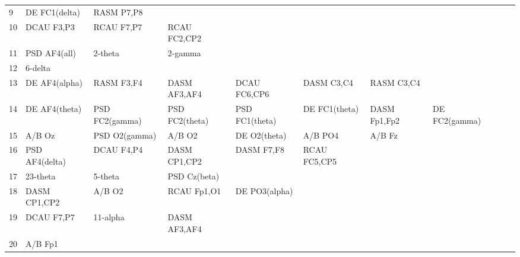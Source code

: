 \begin{landscape}
\begin{table}[]
\begin{tabular}{l|llllllll}
9        & DE FC1(delta)  & RASM P7,P8     &                &                &                &                &                &                &               &              \\
10       & DCAU F3,P3     & RCAU F7,P7     & RCAU FC2,CP2   &                &                &                &                &                &               &              \\
11       & PSD AF4(all)   & 2-theta        & 2-gamma        &                &                &                &                &                &               &              \\
12       & 6-delta        &                &                &                &                &                &                &                &               &              \\
13       & DE AF4(alpha)  & RASM F3,F4     & DASM AF3,AF4   & DCAU FC6,CP6   & DASM C3,C4     & RASM C3,C4     &                &                &               &              \\
14       & DE AF4(theta)  & PSD FC2(gamma) & PSD FC2(theta) & PSD FC1(theta) & DE FC1(theta)  & DASM Fp1,Fp2   & DE FC2(gamma)  &                &               &              \\
15       & A/B Oz         & PSD O2(gamma)  & A/B O2         & DE O2(theta)   & A/B PO4        & A/B Fz         &                &                &               &              \\
16       & PSD AF4(delta) & DCAU F4,P4     & DASM CP1,CP2   & DASM F7,F8     & RCAU FC5,CP5   &                &                &                &               &              \\
17       & 23-theta       & 5-theta        & PSD Cz(beta)   &                &                &                &                &                &               &              \\
18       & DASM CP1,CP2   & A/B O2         & RCAU Fp1,O1    & DE PO3(alpha)  &                &                &                &                &               &              \\
19       & DCAU F7,P7     & 11-alpha       & DASM AF3,AF4   &                &                &                &                &                &               &              \\
20       & A/B Fp1        &                &                &                &                &                &                &                &               &              \\

\end{tabular}
\end{table}
\end{landscape}
